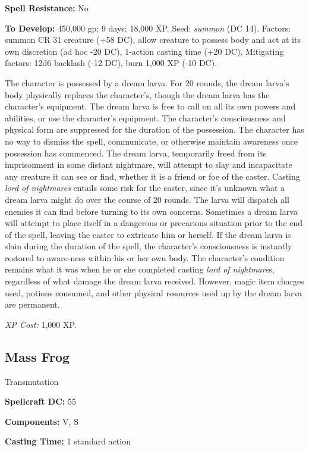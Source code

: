 \documentclass{article}
\begin{document}
\textbf{Spell Resistance:} No 

\textbf{To Develop:} 450,000 gp; 9 days; 18,000 XP. Seed: \textit{summon }(DC 14). 
Factors: summon CR 31 creature (+58 DC), allow creature to possess body and act 
at its own discretion (ad hoc -20 DC), 1-action casting time (+20 DC). Mitigating 
factors: 12d6 backlash (-12 DC), burn 1,000 XP (-10 DC). 

The character is possessed by a dream larva. For 20 rounds, the dream larva's body 
physically replaces the character's, though the dream larva has the character's 
equipment. The dream larva is free to call on all its own powers and abilities, 
or use the character's equipment. The character's consciousness and physical form 
are suppressed for the duration of the possession. The character has no way to 
dismiss the spell, communicate, or otherwise maintain awareness once possession 
has commenced. The dream larva, temporarily freed from its imprisonment in some 
distant nightmare, will attempt to slay and incapacitate any creature it can see 
or find, whether it is a friend or foe of the caster. Casting \textit{lord of nightmares 
}entails some risk for the caster, since it's unknown what a dream larva might 
do over the course of 20 rounds. The larva will dispatch all enemies it can find 
before turning to its own concerns. Sometimes a dream larva will attempt to place 
itself in a dangerous or precarious situation prior to the end of the spell, leaving 
the caster to extricate him or herself. If the dream larva is slain during the 
duration of the spell, the character's consciousness is instantly restored to aware-ness 
within his or her own body. The character's condition remains what it was when 
he or she completed casting \textit{lord of nightmare}s, regardless of what damage 
the dream larva received. However, magic item charges used, potions consumed, and 
other physical resources used up by the dream larva are permanent. 

\textit{XP Cost: }1,000 XP. 

\vspace{12pt}
\subsection*{Mass Frog }

Transmutation 

\textbf{Spellcraft DC:} 55 

\textbf{Components:} V, S 

\textbf{Casting Time:} 1 standard action 
\end{document}
